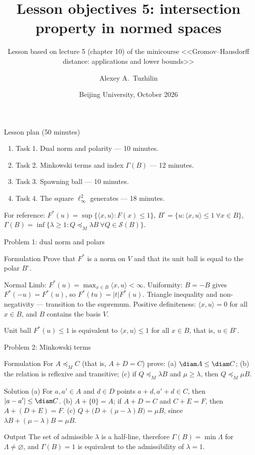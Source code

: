 \documentclass[aspectratio=169,11pt]{beamer}
\title[Lesson 5 objectives]{Lesson objectives \textup{5}: intersection property in normed spaces}
\subtitle{Lesson based on lecture \textup{5} (chapter \textup{10}) of the minicourse <<Gromov--Hausdorff distance: applications and lower bounds>>}
\author{Alexey A.~Tuzhilin}
\date{Beijing University, October 2026}
\begin{document}
\begin{frame}
\titlepage
\end{frame}

\begin{frame}{Lesson plan (\textup{50} minutes)}
\begin{enumerate}
\item Task \textup{1}. Dual norm and polarity --- \textup{10} minutes.
\item Task \textup{2}. Minkowski terms and index $\Gamma(B)$ --- \textup{12} minutes.
\item Task \textup{3}. Spawning ball --- \textup{10} minutes.
\item Task \textup{4}. The square $\ell_\infty^2$ generates --- \textup{18} minutes.
\end{enumerate}
\medskip
For reference\textup{:} $F^*(u)=\sup\{\langle x,u\rangle: F(x)\le1\}$, $B^\circ=\{u: \langle x,u\rangle\le1\ \forall x\in B\}$, $\Gamma(B)=\inf\{\lambda\ge1: Q\preceq_M\lambda B\ \forall Q\in\mathcal S(B)\}$.
\end{frame}

\begin{frame}{Problem \textup{1}: dual norm and polars}
\begin{block}{Formulation}
Prove that $F^*$ is a norm on $V$ and that its unit ball is equal to the polar $B^\circ$.
\end{block}
\begin{block}{Normal}
Limb\textup{:} $F^*(u)=\max_{x\in B}\langle x,u\rangle<\infty$. Uniformity\textup{:} $B=-B$ gives $F^*(-u)=F^*(u)$, so $F^*(tu)=|t|F^*(u)$. Triangle inequality and non-negativity --- transition to the supremum. Positive definiteness\textup{:} $\langle x,u\rangle=0$ for all $x\in B$, and $B$ contains the basis $V$.
\end{block}
\begin{block}{Unit ball}
$F^*(u)\le1$ is equivalent to $\langle x,u\rangle\le1$ for all $x\in B$, that is, $u\in B^\circ$.
\end{block}
\end{frame}

\begin{frame}{Problem \textup{2}: Minkowski terms}
\begin{block}{Formulation}
For $A\preceq_M C$ (that is, $A+D=C$) prove\textup{:} \textup{(a)} $\diam A\le\diam C$\textup{;} \textup{(b)} the relation is reflexive and transitive\textup{;} \textup{(c)} if $Q\preceq_M\lambda B$ and $\mu\ge\lambda$, then $Q\preceq_M\mu B$.
\end{block}
\begin{block}{Solution}
\textup{(a)} For $a,a'\in A$ and $d\in D$ points $a+d,a'+d\in C$, then $|a-a'|\le\diam C$.
\textup{(b)} $A+\{0\}=A$\textup{;} if $A+D=C$ and $C+E=F$, then $A+(D+E)=F$.
\textup{(c)} $Q+\bigl(D+(\mu-\lambda)B\bigr)=\mu B$, since $\lambda B+(\mu-\lambda)B=\mu B$.
\end{block}
\begin{block}{Output}
The set of admissible $\lambda$ is a half-line, therefore $\Gamma(B)=\min\Lambda$ for $\Lambda\ne\varnothing$, and $\Gamma(B)=1$ is equivalent to the admissibility of $\lambda=1$.
\end{block}
\end{frame}
\end{document}

